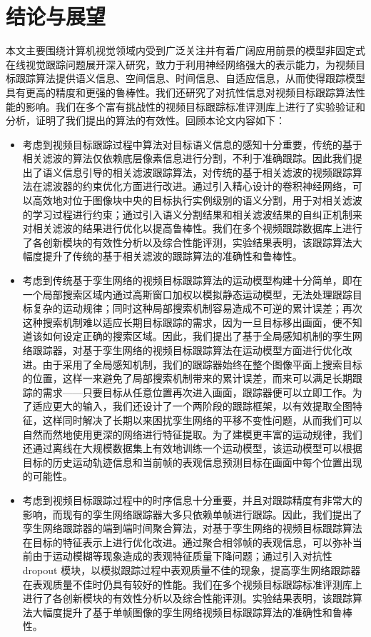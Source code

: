 \chapter{结论与展望}\label{chap:conclusion}
本文主要围绕计算机视觉领域内受到广泛关注并有着广阔应用前景的模型非固定式在线视觉跟踪问题展开深入研究，致力于利用神经网络强大的表示能力，为视频目标跟踪算法提供语义信息、空间信息、时间信息、自适应信息，从而使得跟踪模型具有更高的精度和更强的鲁棒性。我们还研究了对抗性信息对视频目标跟踪算法性能的影响。我们在多个富有挑战性的视频目标跟踪标准评测库上进行了实验验证和分析，证明了我们提出的算法的有效性。回顾本论文内容如下：
\begin{itemize}
\item 考虑到视频目标跟踪过程中算法对目标语义信息的感知十分重要，传统的基于相关滤波的算法仅依赖底层像素信息进行分割，不利于准确跟踪。因此我们提出了语义信息引导的相关滤波跟踪算法，对传统的基于相关滤波的视频跟踪算法在滤波器的约束优化方面进行改进。通过引入精心设计的卷积神经网络，可以高效地对位于图像块中央的目标执行实例级别的语义分割，用于对相关滤波的学习过程进行约束；通过引入语义分割结果和相关滤波结果的自纠正机制来对相关滤波的结果进行优化以提高鲁棒性。我们在多个视频跟踪数据库上进行了各创新模块的有效性分析以及综合性能评测，实验结果表明，该跟踪算法大幅度提升了传统的基于相关滤波的跟踪算法的准确性和鲁棒性。
\item 考虑到传统基于孪生网络的视频目标跟踪算法的运动模型构建十分简单，即在一个局部搜索区域内通过高斯窗口加权以模拟静态运动模型，无法处理跟踪目标复杂的运动规律；同时这种局部搜索机制容易造成不可逆的累计误差；再次这种搜索机制难以适应长期目标跟踪的需求，因为一旦目标移出画面，便不知道该如何设定正确的搜索区域。因此，我们提出了基于全局感知机制的孪生网络跟踪器，对基于孪生网络的视频目标跟踪算法在运动模型方面进行优化改进。由于采用了全局感知机制，我们的跟踪器始终在整个图像平面上搜索目标的位置，这样一来避免了局部搜索机制带来的累计误差，而来可以满足长期跟踪的需求——只要目标从任意位置再次进入画面，跟踪器便可以立即工作。为了适应更大的输入，我们还设计了一个两阶段的跟踪框架，以有效提取全图特征，这样同时解决了长期以来困扰孪生网络的平移不变性问题，从而我们可以自然而然地使用更深的网络进行特征提取。为了建模更丰富的运动规律，我们还通过离线在大规模数据集上有效地训练一个运动模型，该运动模型可以根据目标的历史运动轨迹信息和当前帧的表观信息预测目标在画面中每个位置出现的可能性。
\item 考虑到视频目标跟踪过程中的时序信息十分重要，并且对跟踪精度有非常大的影响，而现有的孪生网络跟踪器大多只依赖单帧进行跟踪。因此，我们提出了孪生网络跟踪器的端到端时间聚合算法，对基于孪生网络的视频目标跟踪算法在目标的特征表示上进行优化改进。通过聚合相邻帧的表观信息，可以弥补当前由于运动模糊等现象造成的表观特征质量下降问题；通过引入对抗性 dropout 模块，以模拟跟踪过程中表观质量不佳的现象，提高孪生网络跟踪器在表观质量不佳时仍具有较好的性能。我们在多个视频目标跟踪标准评测库上进行了各创新模块的有效性分析以及综合性能评测。实验结果表明，该跟踪算法大幅度提升了基于单帧图像的孪生网络视频目标跟踪算法的准确性和鲁棒性。

\end{itemize}
